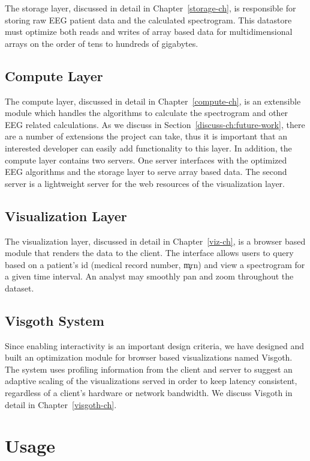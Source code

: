The storage layer, discussed in detail in Chapter~\ref{storage-ch}, is
responsible for storing raw EEG patient data and the calculated spectrogram.
This datastore must optimize both reads and writes of array based data for
multidimensional arrays on the order of tens to hundreds of gigabytes.

\subsection{Compute Layer}

The compute layer, discussed in detail in Chapter~\ref{compute-ch}, is an
extensible module which handles the algorithms to calculate the spectrogram and
other EEG related calculations. As we discuss in
Section~\ref{discuss-ch:future-work}, there are a number of extensions the
project can take, thus it is important that an interested developer can easily
add functionality to this layer. In addition, the compute layer contains two
servers. One server interfaces with the optimized EEG algorithms and the
storage layer to serve array based data. The second server is a lightweight
server for the web resources of the visualization layer.

\subsection{Visualization Layer}

The visualization layer, discussed in detail in Chapter~\ref{viz-ch}, is a browser
based module that renders the data to the client. The interface allows users to
query based on a patient's id (medical record number, \c{mrn}) and view a spectrogram
for a given time interval. An analyst may smoothly pan and zoom throughout the dataset.

\subsection{Visgoth System}

Since enabling interactivity is an important design criteria, we have designed
and built an optimization module for browser based visualizations named
Visgoth. The system uses profiling information from the client and server to
suggest an adaptive scaling of the visualizations served in order to keep
latency consistent, regardless of a client's hardware or network bandwidth. We
discuss Visgoth in detail in Chapter~\ref{visgoth-ch}.

\section{Usage}

